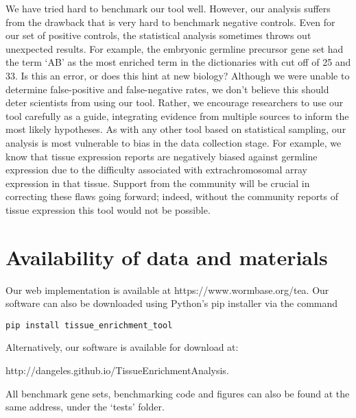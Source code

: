 \documentclass[linenumbers, doublespacing]{bmcart}
\begin{document}
We have tried hard to benchmark our tool well. However, our analysis suffers from the drawback that is very hard to benchmark negative controls. Even for our set of positive controls, the statistical analysis sometimes throws out unexpected results. For example, the embryonic germline precursor gene set had the term `AB' as the most enriched term in the dictionaries with cut off of 25 and 33. Is this an error, or does this hint at new biology? Although we were unable to determine false-positive and false-negative rates, we don't believe this should deter scientists from using our tool. Rather, we encourage researchers to use our tool carefully as a guide, integrating evidence from multiple sources to inform the most likely hypotheses. As with any other tool based on statistical sampling, our analysis is most vulnerable to bias in the data collection stage. For example, we know that tissue expression reports are negatively biased against germline expression due to the difficulty associated with extrachromosomal array expression in that tissue. Support from the community will be crucial in correcting these flaws going forward; indeed, without the community reports of tissue expression this tool would not be possible. 

\section*{Availability of data and materials}
Our web implementation is available at https://www.wormbase.org/tea. Our software can also be downloaded using Python's pip installer via the command 

\texttt{pip install tissue\_enrichment\_tool}

Alternatively, our software is available for download at:

http://dangeles.github.io/TissueEnrichmentAnalysis. 

All benchmark gene sets, benchmarking code and figures can also be found at the same address, under the `tests' folder. 
\end{document}
